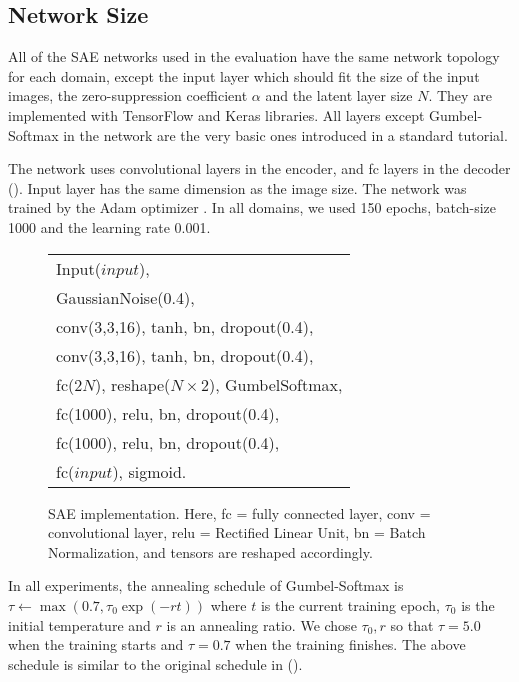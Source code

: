 \documentclass[10pt,letterpaper]{article}
\begin{document}
\subsection{Network Size}
\label{network-implementation}
All of the SAE networks used in the evaluation have the same network
topology for each domain, except the input layer which should fit the size of the input
images, the zero-suppression coefficient $\alpha$ and the latent layer size $N$.
They are implemented with TensorFlow and Keras libraries.
All layers except Gumbel-Softmax in the network are the very basic ones introduced in a standard tutorial.

The network uses convolutional layers in the encoder, and fc layers
in the decoder ().
Input layer has the same dimension as the image size.
The network was trained by the Adam optimizer \cite{kingma2014adam}.
In all domains, we used 150 epochs, batch-size 1000 and the learning rate 0.001.

\begin{figure}[htb]
\centering
\begin{tabular}{|l|}
 Input($input$),\\
 GaussianNoise(0.4),\\
 conv(3,3,16), tanh, bn, dropout(0.4),\\
 conv(3,3,16), tanh, bn, dropout(0.4),\\
 fc(2$N$), reshape($N\times 2$), GumbelSoftmax,\\
 fc(1000), relu, bn, dropout(0.4),\\
 fc(1000), relu, bn, dropout(0.4),\\
 fc($input$), sigmoid.
\end{tabular}
\caption{SAE implementation.
 Here, fc = fully connected layer, conv = convolutional layer, 
relu = Rectified Linear Unit,
bn = Batch Normalization, %
and tensors are reshaped accordingly.}
\label{fig:sae-detail}
\end{figure}


In all experiments, 
the annealing schedule of Gumbel-Softmax is $\tau \leftarrow \max (0.7, \tau_0\exp(-rt))$ where
 $t$ is the current training epoch, $\tau_0$ is the initial temperature and $r$ is an annealing ratio.
We chose $\tau_0,r$ so that $\tau = 5.0$ when the training starts and $\tau = 0.7$ when the training finishes.
The above schedule is similar to the original schedule in  \citeauthor{jang2016categorical} (\citeyear{jang2016categorical}).
\end{document}

